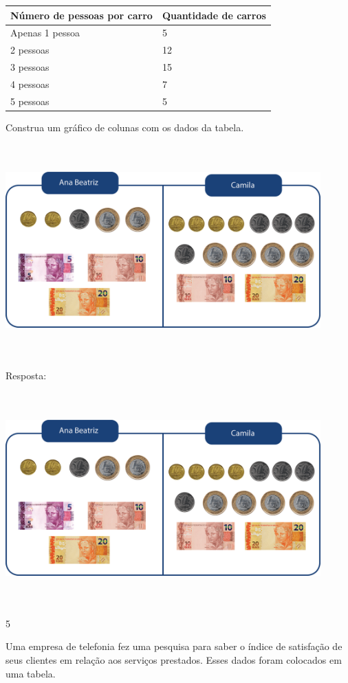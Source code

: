 \begin{escolha}
{\begin{escolha}
{\begin{longtable}[]{@{}ll@{}}
\toprule
Número de pessoas por carro & Quantidade de carros\tabularnewline
\midrule
\endhead
Apenas 1 pessoa & 5\tabularnewline
2 pessoas & 12\tabularnewline
3 pessoas & 15\tabularnewline
4 pessoas & 7\tabularnewline
5 pessoas & 5\tabularnewline
\bottomrule
\end{longtable}

Construa um gráfico de colunas com os dados da tabela.


\includegraphics[width=4.76708in,height=3.21695in]{media/image95.png}

Resposta:

\includegraphics[width=4.76708in,height=3.21695in]{media/image95.png}

\num{5}

Uma empresa de telefonia fez uma pesquisa para saber o índice de
satisfação de seus clientes em relação aos serviços prestados. Esses dados foram
colocados em uma tabela.

}
\end{escolha}}
\end{escolha}
